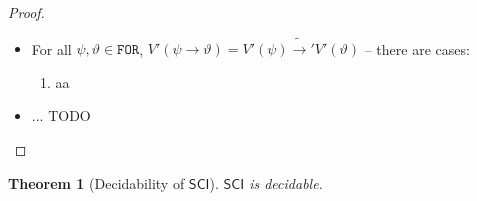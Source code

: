 \documentclass{article}
\newtheorem{theorem}{Theorem}
\theoremstyle{definition}
\theoremstyle{definition}
\theoremstyle{definition}
\newcommand*{\ra}{\rightarrow}
\newcommand*{\FOR}{\texttt{FOR}}
\newcommand{\SCI}{$\mathsf{SCI}$\xspace}
\begin{document}
\begin{proof}
\begin{itemize}
\begin{enumerate}
              \end{enumerate}
        \item For all $\psi, \vartheta \in \FOR$, $V'(\psi \ra \vartheta) = V'(\psi)
                  \tilde{\ra}' V'(\vartheta)$ -- there are cases:
              \begin{enumerate}
                \item[1°] aa
              \end{enumerate}
        \item ... TODO
    \end{itemize}
\end{proof}

\begin{theorem}[Decidability of \SCI]
    \label{decidability}
    \SCI is decidable.
\end{theorem}
\end{document}

